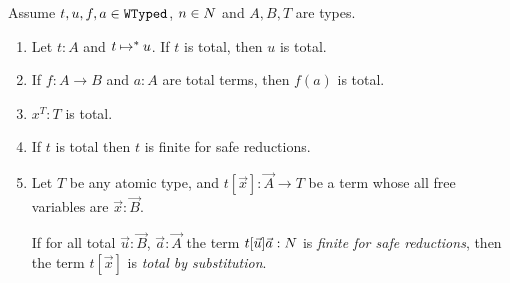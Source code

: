 \begin{lemma}\label{lem:total_value-finiteness}
Assume $t,u,f,a \in {\tt WTyped}$, $n \in {N}$ and $A,B,T$ are types.

  \begin{enumerate}
  \item
\label{lem:total_value-finiteness1}
    Let $t:A$ and $t \mathbin{\mapsto}^* u$.
    If $t$ is total, then $u$ is total.

  \item
\label{lem:total_value-finiteness2}
    If $f:A \rightarrow B$ and $a:A$ are total terms, then $f(a)$ is total.

  \item
\label{lem:total_value-finiteness2bis}
    $x^T:T$ is total.

 \item
\label{lem:total_value-finiteness2ter}
  If $t$ is total then $t$ is  finite for safe reductions.

  \item
\label{lem:total_value-finiteness3}
    Let $T$ be any atomic type, and $t[\vec{x}]:\vec{A}\rightarrow T$ be a term
    whose all free variables are $\vec{x}:\vec{B}$.

    If for all total $\vec{u}:\vec{B}$, $\vec{a}:\vec{A}$ the term 
    $t[\vec{u}]\vec{a}:{N}$ is \emph{finite for safe reductions}, then
    the term $t[\vec{x}]$ is \emph{total by substitution}.
  \end{enumerate}

\end{lemma}




